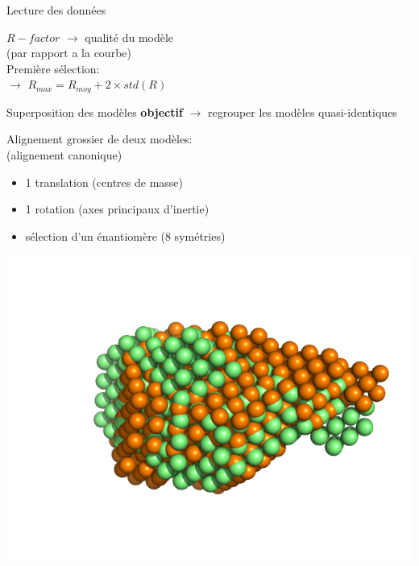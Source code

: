 \documentclass{beamer}
\begin{document}
\begin{frame}{Lecture des donn\'ees}
\begin{minipage}{0.50\linewidth}
\vspace{0.2cm}

$R-factor$ $\longrightarrow$ qualit\'e du mod\`ele\\
(par rapport a la courbe)\\

Premi\`ere s\'election:\\
$\longrightarrow$ $R_{max} = R_{moy} + 2 \times std(R)$
\end{minipage}
\end{frame}

\begin{frame}{Superposition des mod\`eles}
\textbf{objectif} $\longrightarrow$ regrouper les mod\`eles quasi-identiques

\vspace{0.2cm}
\begin{minipage}{0.70\linewidth}
Alignement grossier de deux mod\`eles:\\ 
(alignement canonique)
\begin{itemize}
\item 1 translation (centres de masse)
\item 1 rotation (axes principaux d'inertie)
\item s\'election d'un \'enantiom\`ere (8 sym\'etries)
\end{itemize}

\includegraphics[scale=0.30]{coarsealign.png}


\end{minipage}
\end{frame}
\end{document}
